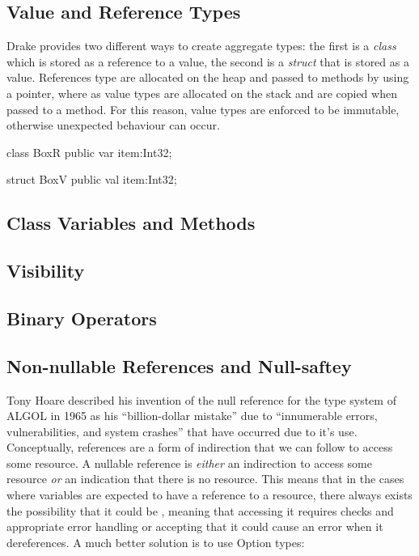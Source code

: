 \documentclass{article}
\newcommand{\bt}{\ensuremath{^{\backprime}}}
\newcommand{\code}[1]{\texttt{\StrSubstitute{#1}{`}{\bt}}}
\newcommand{\bcode}[1]{\code{#1}}
\newcommand{\plname}[0]{Drake\xspace}
\begin{document}
\subsection{Value and Reference Types}
\plname provides two different ways to create aggregate types: the first is a \textit{class} which is stored as a reference to a value, the second is a \textit{struct} that is stored as a value. References type are allocated on the heap and passed to methods by using a pointer, where as value types are allocated on the stack and are copied when passed to a method. For this reason, value types are enforced to be immutable, otherwise unexpected behaviour can occur.

\begin{sooplisting}
class BoxR {
	public var item:Int32;
}

struct BoxV {
	public val item:Int32;
}
\end{sooplisting}



\subsection{Class Variables and Methods}

\subsection{Visibility}

\subsection{Binary Operators}

\subsection{Non-nullable References and Null-saftey}
Tony Hoare described his invention of the null reference for the type system of ALGOL in 1965 as his ``billion-dollar mistake'' due to ``innumerable errors, vulnerabilities, and system crashes'' that have occurred due to it's use\cite{HOARE:2009}. Conceptually, references are a form of indirection that we can follow to access some resource. A nullable reference is \textit{either} an indirection to access some resource \textit{or} an indication that there is no resource. This means that in the cases where variables are expected to have a reference to a resource, there always exists the possibility that it could be \bcode{null}, meaning that accessing it requires \bcode{null} checks and appropriate error handling or accepting that it could cause an error when it dereferences.
A much better solution is to use Option types:
\end{document}
